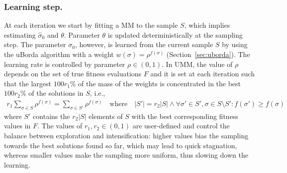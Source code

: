 \documentclass[runningheads]{llncs}
\begin{document}
\subsubsection{Learning step.}
At each iteration we start by fitting a MM to the sample $S$, which implies
estimating $\hat\sigma_0$ and $\theta$. Parameter $\theta$ is updated
deterministically at the sampling step.  The parameter $\sigma_0$, however, is
learned from the current sample $S$ by using the uBorda algorithm with a weight
$w(\sigma)=\rho^{f(\sigma)}$ (Section~\ref{sec:uborda}). The learning rate is
controlled by parameter $\rho \in (0,1)$. %
In UMM, the value of $\rho$ depends on the set of true fitness evaluations $F$
and it is set at each iteration such that the largest $100r_1$\% of the mass of
the weights is concentrated in the best $100r_2$\% of the solutions in $S$, i.e.,
%
\begin{equation}
\begin{split}
r_1 \sum_{\sigma\in S}\rho^{f(\sigma)} =  \sum_{\sigma\in S'}\rho^{f(\sigma)} \quad\text{where}\quad |S'| = r_2|S| \land \forall \sigma'\in S', \sigma\in S\setminus S' : f(\sigma')\geq f(\sigma)
\end{split}
\end{equation}
%
where $S'$ contains the $r_2|S|$ elements of $S$ with the best corresponding fitness values in $F$. The values of $r_1, r_2 \in (0, 1)$ are user-defined and control the balance between exploration and intensification: higher values bias the sampling towards the best solutions found so far, which may lead to quick stagnation, whereas smaller values make the sampling more uniform, thus slowing down the learning.



\end{document}
